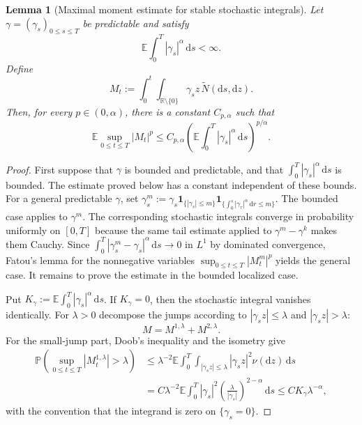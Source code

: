 \documentclass[10pt,a4paper]{amsart}
\newtheorem{lemma}[theorem]{Lemma}
\newcommand{\R}{\mathbb{R}}
\newcommand{\E}{\mathbb{E}}
\newcommand{\Pbb}{\mathbb{P}}
\newcommand{\1}{\mathbf{1}}
\newcommand{\dd}{\,\mathrm{d}}
\newcommand{\md}{\mathrm{d}}
\newcommand{\wt}{\tilde}
\begin{document}
\begin{lemma}[Maximal moment estimate for stable stochastic integrals]\label{lem:stable-max}
Let $\gamma=(\gamma_s)_{0\le s\le T}$ be predictable and satisfy
\[
  \E\int_0^T |\gamma_s|^\alpha\dd s<\infty.
\]
Define
\[
  M_t:=\int_0^t\int_{\R\setminus\{0\}}\gamma_s z\,\wt N(\md s,\md z).
\]
Then, for every $p\in(0,\alpha)$, there is a constant $C_{p,\alpha}$ such that
\[
  \E\sup_{0\le t\le T}|M_t|^p
  \le C_{p,\alpha}\left(\E\int_0^T |\gamma_s|^\alpha\dd s\right)^{p/\alpha}.
\]
\end{lemma}


\begin{proof}
First suppose that $\gamma$ is bounded and predictable, and that $\int_0^T|\gamma_s|^\alpha\dd s$ is bounded. The estimate proved below has a constant independent of these bounds. For a general predictable $\gamma$, set $\gamma^{m}_s:=\gamma_s\mathbf 1_{\{|\gamma_s|\le m\}}\mathbf 1_{\{\int_0^s|\gamma_r|^\alpha\dd r\le m\}}$. The bounded case applies to $\gamma^m$. The corresponding stochastic integrals converge in probability uniformly on $[0,T]$ because the same tail estimate applied to $\gamma^m-\gamma^k$ makes them Cauchy. Since $\int_0^T|\gamma_s^m-\gamma_s|^\alpha\dd s\to0$ in $L^1$ by dominated convergence, Fatou's lemma for the nonnegative variables $\sup_{0\le t\le T}|M_t^m|^p$ yields the general case. It remains to prove the estimate in the bounded localized case.

Put $K_\gamma:=\E\int_0^T|\gamma_s|^\alpha\dd s$. If $K_\gamma=0$, then the stochastic integral vanishes identically. For $\lambda>0$ decompose the jumps according to $|\gamma_s z|\le\lambda$ and $|\gamma_s z|>\lambda$:
\[
  M=M^{1,\lambda}+M^{2,\lambda}.
\]
For the small-jump part, Doob's inequality and the isometry give
\begin{align*}
\Pbb\left(\sup_{0\le t\le T}|M_t^{1,\lambda}|>\lambda\right)
&\le \lambda^{-2}\E\int_0^T\int_{|\gamma_s z|\le\lambda}|\gamma_s z|^2\nu(\md z)\dd s\\
&= C \lambda^{-2}\E\int_0^T |\gamma_s|^2\left( \frac{\lambda}{|\gamma_s|}\right)^{2-\alpha}\dd s
\le C K_\gamma\lambda^{-\alpha},
\end{align*}
with the convention that the integrand is zero on $\{\gamma_s=0\}$.


\end{proof}
\end{document}
